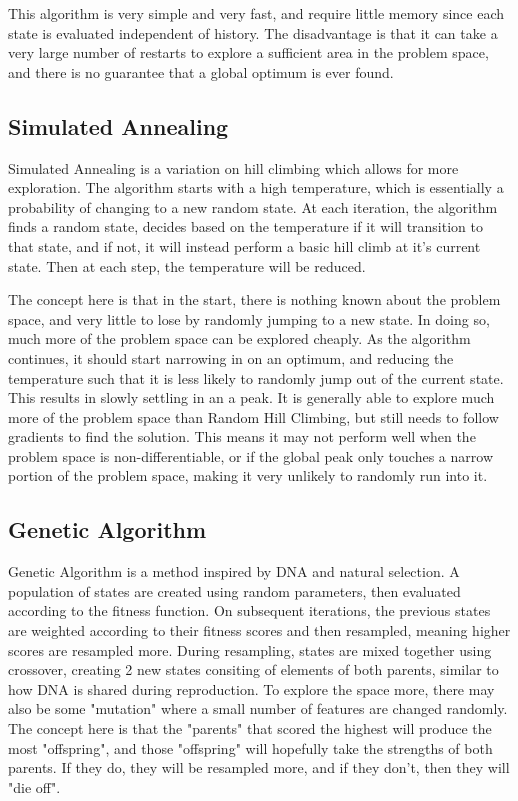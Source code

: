\documentclass[
	letterpaper, %
]{mlreport}
\begin{document}
This algorithm is very simple and very fast, and require little memory since each state is evaluated independent of history. The disadvantage is that it can take a very large number of restarts to explore a sufficient area in the problem space, and there is no guarantee that a global optimum is ever found.

\subsection{Simulated Annealing}
Simulated Annealing is a variation on hill climbing which allows for more exploration. The algorithm starts with a high temperature, which is essentially a probability of changing to a new random state. At each iteration, the algorithm finds a random state, decides based on the temperature if it will transition to that state, and if not, it will instead perform a basic hill climb at it's current state. Then at each step, the temperature will be reduced.

The concept here is that in the start, there is nothing known about the problem space, and very little to lose by randomly jumping to a new state. In doing so, much more of the problem space can be explored cheaply. As the algorithm continues, it should start narrowing in on an optimum, and reducing the temperature such that it is less likely to randomly jump out of the current state. This results in slowly settling in an a peak. It is generally able to explore much more of the problem space than Random Hill Climbing, but still needs to follow gradients to find the solution. This means it may not perform well when the problem space is non-differentiable, or if the global peak only touches a narrow portion of the problem space, making it very unlikely to randomly run into it.

\subsection{Genetic Algorithm}
Genetic Algorithm is a method inspired by DNA and natural selection. A population of states are created using random parameters, then evaluated according to the fitness function. On subsequent iterations, the previous states are weighted according to their fitness scores and then resampled, meaning higher scores are resampled more. During resampling, states are mixed together using crossover, creating 2 new states consiting of elements of both parents, similar to how DNA is shared during reproduction. To explore the space more, there may also be some "mutation" where a small number of features are changed randomly. The concept here is that the "parents" that scored the highest will produce the most "offspring", and those "offspring" will hopefully take the strengths of both parents. If they do, they will be resampled more, and if they don't, then they will "die off".
\end{document}
